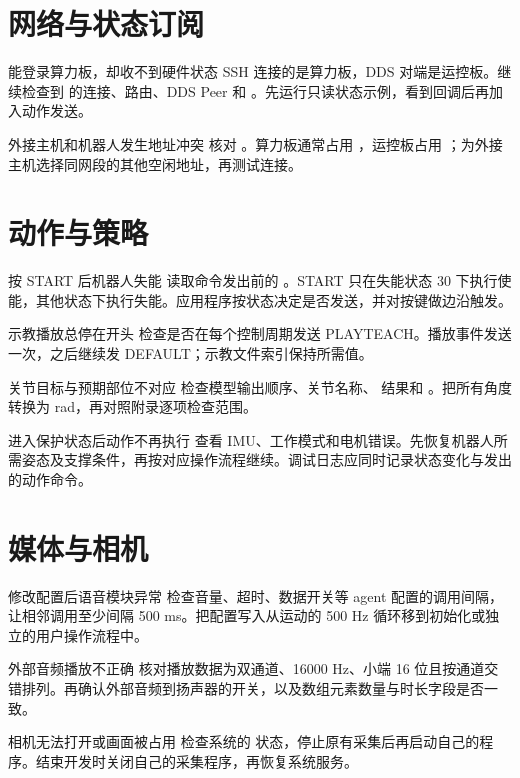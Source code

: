 \section{网络与状态订阅}
\begin{faq}{能登录算力板，却收不到硬件状态}
SSH 连接的是算力板，DDS 对端是运控板。继续检查到  的连接、路由、DDS Peer 和 。先运行只读状态示例，看到回调后再加入动作发送。
\end{faq}
\begin{faq}{外接主机和机器人发生地址冲突}
核对 。算力板通常占用 ，运控板占用 ；为外接主机选择同网段的其他空闲地址，再测试连接。
\end{faq}
\section{动作与策略}
\begin{faq}{按 START 后机器人失能}
读取命令发出前的 。START 只在失能状态 30 下执行使能，其他状态下执行失能。应用程序按状态决定是否发送，并对按键做边沿触发。
\end{faq}
\begin{faq}{示教播放总停在开头}
检查是否在每个控制周期发送 PLAYTEACH。播放事件发送一次，之后继续发 DEFAULT；示教文件索引保持所需值。
\end{faq}
\begin{faq}{关节目标与预期部位不对应}
检查模型输出顺序、关节名称、 结果和 。把所有角度转换为 rad，再对照附录逐项检查范围。
\end{faq}
\begin{faq}{进入保护状态后动作不再执行}
查看 IMU、工作模式和电机错误。先恢复机器人所需姿态及支撑条件，再按对应操作流程继续。调试日志应同时记录状态变化与发出的动作命令。
\end{faq}
\section{媒体与相机}
\begin{faq}{修改配置后语音模块异常}
检查音量、超时、数据开关等 agent 配置的调用间隔，让相邻调用至少间隔 500 ms。把配置写入从运动的 500 Hz 循环移到初始化或独立的用户操作流程中。
\end{faq}
\begin{faq}{外部音频播放不正确}
核对播放数据为双通道、16000 Hz、小端 16 位且按通道交错排列。再确认外部音频到扬声器的开关，以及数组元素数量与时长字段是否一致。
\end{faq}
\begin{faq}{相机无法打开或画面被占用}
检查系统的  状态，停止原有采集后再启动自己的程序。结束开发时关闭自己的采集程序，再恢复系统服务。
\end{faq}

